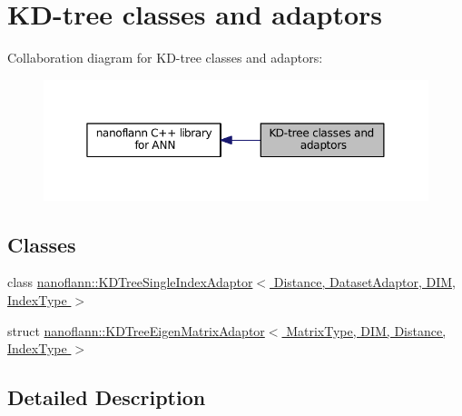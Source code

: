 \hypertarget{group__kdtrees__grp}{\section{K\-D-\/tree classes and adaptors}
\label{group__kdtrees__grp}
}
Collaboration diagram for K\-D-\/tree classes and adaptors\-:\nopagebreak
\begin{figure}[H]
\begin{center}
\leavevmode
\includegraphics[width=350pt]{group__kdtrees__grp}
\end{center}
\end{figure}
\subsection*{Classes}
\begin{DoxyCompactItemize}
\item 
class \hyperlink{classnanoflann_1_1_k_d_tree_single_index_adaptor}{nanoflann\-::\-K\-D\-Tree\-Single\-Index\-Adaptor$<$ Distance, Dataset\-Adaptor, D\-I\-M, Index\-Type $>$}
\item 
struct \hyperlink{structnanoflann_1_1_k_d_tree_eigen_matrix_adaptor}{nanoflann\-::\-K\-D\-Tree\-Eigen\-Matrix\-Adaptor$<$ Matrix\-Type, D\-I\-M, Distance, Index\-Type $>$}
\end{DoxyCompactItemize}


\subsection{Detailed Description}
